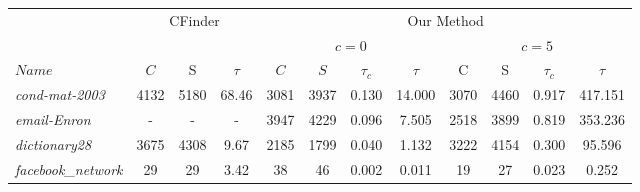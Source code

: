 \begin{table}
\begin{tabular}{ l || c c c | c c c c | c c c c }
\toprule\toprule
 					&  		\multicolumn{3}{c}{CFinder}			&		\multicolumn{8}{|c}{Our Method}			\\
 					&  		\multicolumn{3}{c}{}			&		\multicolumn{4}{|c}{$c=0$}			&	\multicolumn{4}{c}{$c=5$}		\\
\hline
$Name$				&	$C$	&	S	&$\tau$		&	$C$	&	$S$	&	$\tau_c$	&	$\tau$	&	C	&	S	&$\tau_c$		&	$\tau$	\\
\hline\hline
{\em cond-mat-2003}		&	4132	&	5180	&	68.46	&	3081	&	3937	&	0.130	&	14.000	&	3070	&	4460	&	0.917	&	417.151	\\
{\em email-Enron}		&	-	&	-	&	-		&	3947	&	4229	&	0.096	&	7.505	&	2518	&	3899	&	0.819	&	353.236	\\
{\em dictionary28}		&	3675	&	4308	&	9.67		&	2185	&	1799	&	0.040	&	1.132	&	3222	&	4154	&	0.300	&	95.596	\\
{\em facebook\_network}	&	29	&	29	&	3.42		&	38	&	46	&	0.002	&	0.011	&	19	&	27	&	0.023	&	0.252	\\
\bottomrule\bottomrule
\end{tabular}

\end{table}
